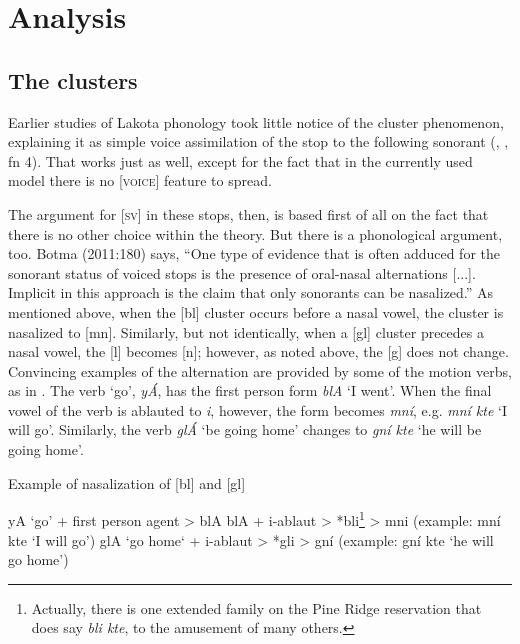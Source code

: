 \documentclass[output=paper]{LSP/langsci}
\begin{document}
\section{Analysis}

\subsection{The clusters}

Earlier studies of Lakota phonology took little notice of the cluster phenomenon, explaining it as simple voice assimilation of the stop to the following sonorant (\citealt[37]{Carter1974}, \citealt[7]{Shaw1980}, \citealt[22]{Patterson1990} fn 4). That works just as well, except for the fact that in the currently used model there is no [\textsc{voice}] feature to spread.

The argument for [\textsc{sv}] in these stops, then, is based first of all on the fact that there is no other choice within the theory. But there is a phonological argument, too. Botma (2011:180) says, ``One type of evidence that is often adduced for the sonorant status of voiced stops is the presence of oral-nasal alternations [...]. Implicit in this approach is the claim that only sonorants can be nasalized.'' As mentioned above, when the [bl] cluster occurs before a nasal vowel, the cluster is nasalized to [mn]. Similarly, but not identically, when a [gl] cluster precedes a nasal vowel, the [l] becomes [n]; however, as noted above, the [g] does not change. Convincing examples of the alternation are provided by some of the motion verbs, as in . The verb `go', \textit{y\'A}, has the first person form \textit{blA} `I went'. When the final vowel of the verb is ablauted to \textit{i}, however, the form becomes \textit{mn\'i}, e.g. \textit{mn\'i kte} `I will go'. Similarly, the verb \textit{gl\'A} `be going home' changes to \textit{gn\'i kte} `he will be going home'.

\begin{exe}
\ex Example of nasalization of [bl] and [gl]
\begin{xlist}
\ex yA `go' + first person agent > blA
\ex blA + i-ablaut > *bli\footnote{Actually, there is one extended family on the Pine Ridge reservation that does say \textit{bli kte}, to the amusement of many others.} > mni (example: mn\'i kte `I will go')
\ex glA `go home` + i-ablaut > *gli > gn\'i (example: gn\'i kte `he will go home')
\end{xlist}
\end{exe}
\end{document}

